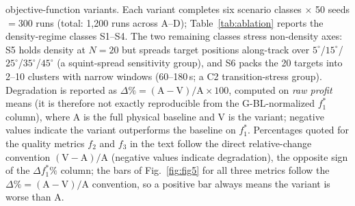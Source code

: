 objective-function variants.
Each variant completes six scenario classes $\times$ 50 seeds $= 300$ runs
(total: 1,200 runs across A--D); Table~\ref{tab:ablation} reports the
density-regime classes S1--S4. The two remaining classes stress non-density
axes: S5 holds density at $N=20$ but spreads target positions along-track
over $5^\circ$/$15^\circ$/$25^\circ$/$35^\circ$/$45^\circ$ (a
squint-spread sensitivity group), and S6 packs the 20 targets into
2--10 clusters with narrow windows (60--180\,s; a C2 transition-stress
group). Degradation is reported as
$\Delta\% = (\text{A} - \text{V})/\text{A} \times 100$, computed on
\emph{raw profit} means (it is therefore not exactly reproducible from the
G-BL-normalized $f_1^*$ column), where A is the full
physical baseline and V is the variant; negative values indicate the variant
outperforms the baseline on $f_1^*$. Percentages quoted for the quality
metrics $f_2$ and $f_3$ in the text follow the direct relative-change
convention $(\text{V}-\text{A})/\text{A}$ (negative values indicate
degradation), the opposite sign of the $\Delta f_1^*\%$ column; the bars of
Fig.~\ref{fig:fig5} for all three metrics follow the
$\Delta\%=(\text{A}-\text{V})/\text{A}$ convention, so a positive bar always
means the variant is worse than A.

